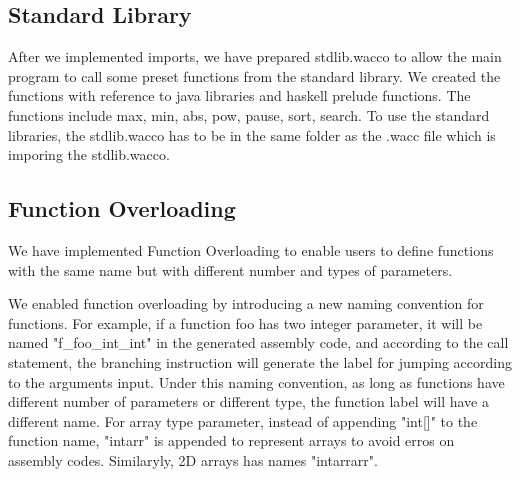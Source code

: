 \documentclass[a4paper]{article}
\theoremstyle{definition}
\begin{document}
\subsection{Standard Library}
After we implemented imports, we have prepared stdlib.wacco to allow the main program to call some preset functions from the standard library. We created the functions with reference to java libraries and haskell prelude functions. The functions include max, min, abs, pow, pause, sort, search. To use the standard libraries, the stdlib.wacco has to be in the same folder as the .wacc file which is imporing the stdlib.wacco.

\subsection{Function Overloading}
We have implemented Function Overloading to enable users to define functions with the same name but with different number and types of parameters. 

We enabled function overloading by introducing a new naming convention for functions. For example, if a function foo has two integer parameter, it will be named "f_foo_int_int" in the generated assembly code, and according to the call statement, the branching instruction will generate the label for jumping according to the arguments input. Under this naming convention, as long as functions have different number of parameters or different type, the function label will have a different name. For array type parameter, instead of appending "int[]" to the function name, "intarr" is appended to represent arrays to avoid erros on assembly codes. Similaryly, 2D arrays has names "intarrarr".


\end{document}
